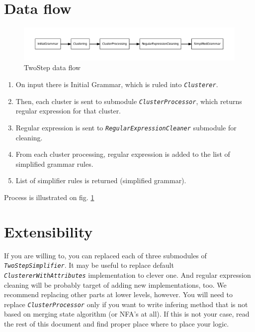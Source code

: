 \documentclass[a4paper,10pt,oneside]{article}
\newcommand{\myscale}{0.74}
\newcommand{\jmodule}[1]{\texttt{\textit{#1}}}
\begin{document}
\section{Data flow}
\begin{figure}
	\centering\includegraphics[scale=\myscale]{twostep_flow}
	\caption{TwoStep data flow} \label{twostep_flow}
\end{figure}
\begin{enumerate}
	\item On input there is Initial Grammar, which is ruled into \jmodule{Clusterer}.
	\item Then, each cluster is sent to submodule \jmodule{ClusterProcessor}, which returns regular expression for that cluster.
	\item Regular expression is sent to \jmodule{RegularExpressionCleaner} submodule for cleaning.
	\item From each cluster processing, regular expression is added to the list of simplified grammar rules.
	\item List of simplifier rules is returned (simplified grammar).
\end{enumerate}
Process is illustrated on fig. \ref{twostep_flow}

\section{Extensibility}
If you are willing to, you can replaced each of three submodules of \jmodule{TwoStepSimplifier}.
It may be useful to replace default \jmodule{ClustererWithAttributes} implementation to clever one.
And regular expression cleaning will be probably target of adding new implementations, too.
We recommend replacing other parts at lower levels, however.
You will need to replace \jmodule{ClusterProcessor} only if you want to write infering method that is not based on merging state algorithm (or NFA's at all).
If this is not your case, read the rest of this document and find proper place where to place your logic.
\end{document}
